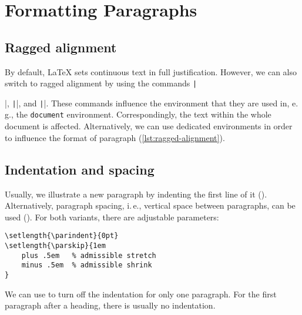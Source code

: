 \chapter{Formatting Paragraphs} %
\label{sec:formatting-paragraphs}

\section*{Ragged alignment}
\label{sec:ragged-alignment}
By default, \LaTeX{} sets continuous text in full justification. 
However, we can also switch to ragged alignment by using the commands 
\texttt|\raggedright|, \texttt|\raggedleft|, and 
\texttt|\centering|. 
These commands influence the environment that they are used in, e.\,g., the 
\texttt{document} environment. Correspondingly, the text within the whole 
document is affected. 
Alternatively, we can use dedicated environments in order to influence the 
format
of  paragraph (\cref{lst:ragged-alignment}).


\section*{Indentation and spacing}
\label{sec:indents-and-parskips}
Usually, we illustrate a new paragraph by indenting the first line of it 
(\texttt{\parindent}). 
Alternatively, paragraph spacing, i.\,e., vertical space between paragraphs, 
can be used (\texttt{\parskip}).
For both variants, there are adjustable parameters:
\begin{verbatim}
\setlength{\parindent}{0pt}
\setlength{\parskip}{1em
    plus .5em   % admissible stretch
    minus .5em  % admissible shrink
}
\end{verbatim}

\noindent We can use \texttt{\noindent} to turn off the indentation for only one 
paragraph. 
For the first paragraph after a heading, there is usually no indentation. 

